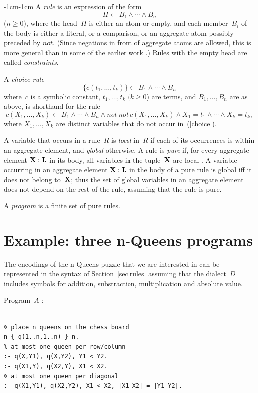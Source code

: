 \documentclass[11pt]{article}
\def\ar{\leftarrow}
\def\beq{\begin{equation}}
\def\eeq#1{\label{#1}\end{equation}}
\def\ba{\begin{array}}
\def\ea{\end{array}}
\def\bfx{{\bf X}}
\newcommand{\no}{\ensuremath{\mathit{not}}}
\begin{document}
\begin{adjustwidth}{-1cm}{-1cm}
A \emph{rule} is an expression of the form
\beq
H \ar B_1\land\cdots\land B_n
\eeq{rule}
($n\geq 0$), where the head~$H$ is either an atom or empty, and
each member~$B_i$ of the body is either a literal, or a comparison,
or an aggregate atom possibly preceded by \no.  (Since negations in front of
aggregate atoms are allowed, this is more general than in some of the
earlier work \cite{lif22a,fan24}.)  Rules with the empty head are called
\emph{constraints}.

A \emph{choice rule}
\beq
\{c(t_1,\dots,t_k)\}\ar B_1\land\cdots\land B_n
\eeq{choice}
where~$c$ is a symbolic constant, $t_1,\dots,t_k$ ($k\geq 0$) are terms, and
$B_1,\dots,B_n$ are as above, is shorthand for the rule
$$%
c(X_1,\dots,X_k)
\ar B_1\land\cdots\land B_n\land\no\ \no\ c(X_1,\dots,X_k)%
\land X_1=t_1\land\cdots\land X_k=t_k,
$$
where $X_1,\dots,X_k$ are distinct variables that do not occur
in~(\ref{choice}).

A variable that occurs in a rule~$R$ is \emph{local} in~$R$ if each of
its occurrences is within an aggregate element, and \emph{global} otherwise.
A rule is \emph{pure} if, for every aggregate element $\bfx:{\bf L}$ in its
body, all variables in the tuple~$\bfx$ are local \cite[Section~4]{lif22a}.
A variable occurring in an aggregate element $\bfx:{\bf L}$ in the body of
a pure rule is global iff it does not belong to~$\bf X$; thus the set of global
variables in an aggregate element does not depend on the rest of the rule,
assuming that the rule is pure.

A \emph{program} is a finite set of pure rules.

\section{Example: three n-Queens programs}\label{sec:examples}

The encodings of the n-Queens puzzle that we are interested in can be
represented in the syntax of Section~\ref{sec:rules} assuming that the
dialect~$D$ includes symbols for addition, substraction, multiplication and
absolute value.

Program~$A$ \cite[Table~2]{geb11b}:
\begin{verbatim}

% place n queens on the chess board
n { q(1..n,1..n) } n.
% at most one queen per row/column
:- q(X,Y1), q(X,Y2), Y1 < Y2.
:- q(X1,Y), q(X2,Y), X1 < X2.
% at most one queen per diagonal
:- q(X1,Y1), q(X2,Y2), X1 < X2, |X1-X2| = |Y1-Y2|.


\end{verbatim}
\end{adjustwidth}
\end{document}
